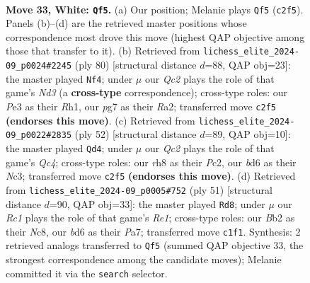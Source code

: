 \documentclass[11pt]{article}
\begin{document}
\clearpage

\begin{figure}[p]\centering
\begin{subfigure}{0.46\textwidth}\centering
\resizebox{\linewidth}{!}{%
\newchessgame
\chessboard[
  setfen={r3k2r/p5pp/3b4/nq1p4/p2P2PP/4P2K/1BQN4/2R5 w - - 1 33},
  showmover=false,
  pgfstyle=straightmove, color=movearrow, markmove={c2-f5}
]}
\caption{}
\end{subfigure}\hfill
\begin{subfigure}{0.46\textwidth}\centering
\resizebox{\linewidth}{!}{%
\newchessgame
\chessboard[
  setfen={5rk1/4p2p/3pPb2/1q5p/1pn1Q3/3N1PP1/R5K1/7R w - - 0 41},
  showmover=false,
  pgfstyle=straightmove, color=movearrow, markmove={d3-f4}
]}
\caption{}
\end{subfigure}
\\[4pt]
\begin{subfigure}{0.46\textwidth}\centering
\resizebox{\linewidth}{!}{%
\newchessgame
\chessboard[
  setfen={r6k/pp1b2pp/2p3n1/8/2Q5/qBNP2PP/2P3P1/5RK1 w - - 4 27},
  showmover=false,
  pgfstyle=straightmove, color=movearrow, markmove={c4-d4}
]}
\caption{}
\end{subfigure}\hfill
\begin{subfigure}{0.46\textwidth}\centering
\resizebox{\linewidth}{!}{%
\newchessgame
\chessboard[
  setfen={k1n1r3/pb2q3/1p4pp/4P3/3QP3/6PB/P6P/2R3K1 b - - 4 26},
  showmover=false,
  pgfstyle=straightmove, color=movearrow, markmove={e8-d8}
]}
\caption{}
\end{subfigure}
\caption{\textbf{Move 33, White: \texttt{Qf5}.} (a) Our position; Melanie plays \texttt{Qf5} (\texttt{c2f5}). Panels (b)--(d) are the retrieved master positions whose correspondence most drove this move (highest QAP objective among those that transfer to it). (b) Retrieved from \texttt{lichess\_elite\_2024-09\_p0024\#2245} (ply 80) [structural distance $d$=88, QAP obj=23]: the master played \texttt{Nf4}; under $\mu$ our \emph{Qc2} plays the role of that game's \emph{Nd3} (a \textbf{cross-type} correspondence); cross-type roles: our \emph{P}e3 as their \emph{R}h1, our \emph{p}g7 as their \emph{R}a2; transferred move \texttt{c2f5} \textbf{(endorses this move)}. (c) Retrieved from \texttt{lichess\_elite\_2024-09\_p0022\#2835} (ply 52) [structural distance $d$=89, QAP obj=10]: the master played \texttt{Qd4}; under $\mu$ our \emph{Qc2} plays the role of that game's \emph{Qc4}; cross-type roles: our \emph{r}h8 as their \emph{P}c2, our \emph{b}d6 as their \emph{N}c3; transferred move \texttt{c2f5} \textbf{(endorses this move)}. (d) Retrieved from \texttt{lichess\_elite\_2024-09\_p0005\#752} (ply 51) [structural distance $d$=90, QAP obj=33]: the master played \texttt{Rd8}; under $\mu$ our \emph{Rc1} plays the role of that game's \emph{Re1}; cross-type roles: our \emph{B}b2 as their \emph{N}c8, our \emph{b}d6 as their \emph{P}a7; transferred move \texttt{c1f1}. Synthesis: 2 retrieved analogs transferred to \texttt{Qf5} (summed QAP objective 33, the strongest correspondence among the candidate moves); Melanie committed it via the \texttt{search} selector.}
\label{fig:thought-m64}
\end{figure}
\end{document}
